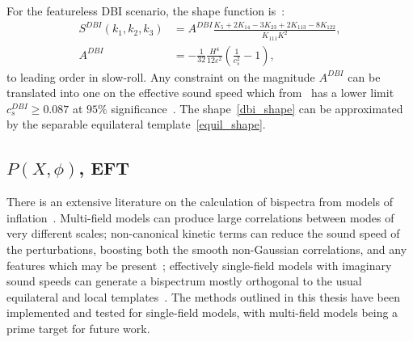For the featureless DBI scenario, the shape function is~\cite{dbi_in_the_sky}:
\begin{align}\label{dbi_shape}
    S^{DBI}(k_1,k_2,k_3) &= A^{DBI}\frac{K_5+2K_{14}-3K_{23}+2K_{113}-8K_{122}}{K_{111}K^2},\\
    A^{DBI} &= -\frac{1}{32}\frac{H^4}{12\varepsilon^2}\left(\frac{1}{c_s^2}-1\right),
\end{align}
to leading order in slow-roll.
Any constraint on the magnitude $A^{DBI}$ can be translated into one 
on the effective sound speed which from \planck~has a lower limit $c_s^{DBI} \geq 0.087$
at $95\%$ significance~\cite{Planck_NG_2015}.
The shape~\eqref{dbi_shape} can be approximated by the separable equilateral template~\eqref{equil_shape}.

    \subsection{$P(X, \phi)$, EFT}
    There is an extensive literature on the calculation
of bispectra from models of inflation~\cite{chen_easther_lim_1,chen_easther_lim_2,chen_ng_0605,seery_ng_0503,px_burrage,adshead,flauger_pajer_resonant,features_bartolo,bdy_passaglia}.
Multi-field models can produce large
correlations between modes of very different scales;
non-canonical kinetic terms can reduce the sound speed of the perturbations,
boosting both the smooth non-Gaussian correlations, and any
features which may be present~\cite{dbi_adshead,dbi_in_the_sky,warp_features_dbi,dbi_silverstein,dbi_step_miranda,chen_folded_resonant,osc_avila};
effectively single-field models with imaginary sound speeds can generate a bispectrum
mostly orthogonal to the usual equilateral and local templates~\cite{RP_1}.
The methods outlined in this thesis have been implemented
and tested for single-field models,
with multi-field models being a prime target for future work.

